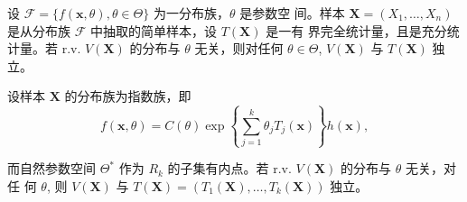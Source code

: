 \begin{theorem}[Basu]\label{thm:Basu}
    设 $\mathcal{F} = \{f(\mathbf{x}, \theta), \theta \in \Theta\}$ 为一分布族，$\theta$ 是参数空
间。样本 $\mathbf{X} = (X_1, \dots, X_n)$ 是从分布族 $\mathcal{F}$ 中抽取的简单样本，设 $T(\mathbf{X})$ 是一有
界完全统计量，且是充分统计量。若 r.v. $V(\mathbf{X})$ 的分布与 $\theta$ 无关，则对任何 $\theta \in \Theta$,
$V(\mathbf{X})$ 与 $T(\mathbf{X})$ 独立。
\end{theorem}
\begin{corollary}\label{cor:Basu}
    设样本 $\mathbf{X}$ 的分布族为指数族，即
$$f(\mathbf{x}, \theta) = C(\theta)\exp\left\{\sum_{j=1}^k \theta_j T_j(\mathbf{x})\right\}h(\mathbf{x}),$$

而自然参数空间 $\Theta^*$ 作为 $R_k$ 的子集有内点。若 r.v. $V(\mathbf{X})$ 的分布与 $\theta$ 无关，对任
何 $\theta$, 则 $V(\mathbf{X})$ 与 $T(\mathbf{X}) = (T_1(\mathbf{X}), \dots, T_k(\mathbf{X}))$ 独立。
\end{corollary}
